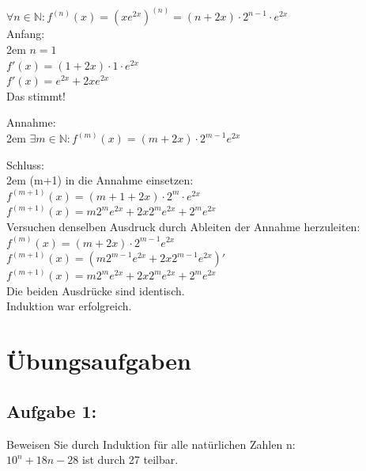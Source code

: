 \documentclass[11pt,final]{scrreprt}
\newcommand{\N} {\mathbb N}
\begin{document}
$ \forall n \in \N : f^{(n)}(x) = \left( xe^{2x} \right)^{(n)} = (n+2x)\cdot 2^{n-1}\cdot e^{2x} $\\

Anfang:\\

\begingroup
\leftskip2em 
$ n=1 $\\
$ f'(x) = (1+2x)\cdot 1 \cdot e^{2x} $\\
$ f'(x) = e^{2x} + 2xe^{2x} $\\
Das stimmt!\\
\par	
\endgroup 

Annahme:\\

\begingroup
\leftskip2em 
 $ \exists m \in \N : f^{(m)}(x) = (m+2x)\cdot 2^{m-1}e^{2x} $\\
\par	
\endgroup 

Schluss:\\

\begingroup
\leftskip2em 
(m+1) in die Annahme einsetzen:\\
$ f^{(m+1)}(x) = (m+1+2x)\cdot 2^m \cdot e^{2x} $\\
$ f^{(m+1)}(x) = m 2^m e^{2x} + 2x2^me^{2x} + 2^me^{2x} $\\

Versuchen denselben Ausdruck durch Ableiten der Annahme herzuleiten:\\
$ f^{(m)}(x) = (m+2x)\cdot 2^{m-1} e^{2x} $\\
$ f^{(m+1)}(x) = \left( m 2^{m-1} e^{2x} + 2x 2^{m-1} e^{2x} \right)' $\\
$ f^{(m+1)}(x) = m 2^{m} e^{2x} + 2x 2^{m} e^{2x} + 2^m e^{2x} $\\

Die beiden Ausdrücke sind identisch.\\
Induktion war erfolgreich.\\
\par	
\endgroup 

\newpage	
\section{Übungsaufgaben}

\subsection*{Aufgabe 1:}

Beweisen Sie durch Induktion für alle natürlichen Zahlen n:\\
\hspace*{2em}$ 10^n + 18n -28 $ ist durch 27 teilbar.
\end{document}
